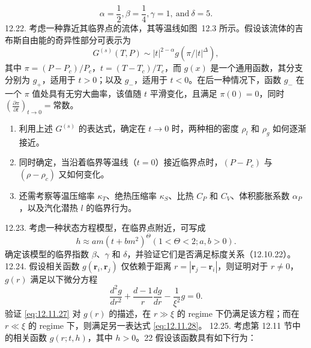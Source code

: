\begin{equation}\tag{12.13.45}\label{eq:12.13.45}
\alpha = \frac { 1 } { 2 } , \beta = \frac { 1 } { 4 } , \gamma = 1 , \mathrm { ~ a n d ~ } \delta = 5 .
\end{equation}
12.22. 考虑一种靠近其临界点的流体，其等温线如图~12.3 所示。假设该流体的吉布斯自由能的奇异性部分可表示为
\begin{equation}\tag{12.13.46}\label{eq:12.13.46}
G ^{( s )} ( T , P ) \sim | t | ^{2 - \alpha} g ( \pi / | t | ^{\Delta} ) ,
\end{equation}
其中 \(\pi = (P - P_{c})/P_{c}\)，\(t = (T - T_{c})/T_{c}\)，而 \(g(x)\) 是一个通用函数，其分支分别为 \(g_{+}\)，适用于 \(t > 0\)；以及 \(g_{-}\)，适用于 \(t < 0\)。在后一种情况下，函数 \(g_{-}\) 在一个 \(\pi\) 值处具有无穷大曲率，该值随 \(t\) 平滑变化，且满足 \(\pi(0) = 0\)，同时 \(\left(\frac{\partial\pi}{\partial t}\right)_{t\to0} = \text{常数}\)。
\begin{enumerate}
\def\labelenumi{(\alph{enumi})}
\item
  利用上述 \(G^{(s)}\) 的表达式，确定在 \(t \rightarrow 0\) 时，两种相的密度 \(\rho_{l}\) 和 \(\rho_{g}\) 如何逐渐接近。
\item
  同时确定，当沿着临界等温线（\(t = 0\)）接近临界点时，\((P - P_{c})\) 与 \((\rho - \rho_{c})\) 又如何变化。
\item
  还需考察等温压缩率 \(\kappa_{T}\)、绝热压缩率 \(\kappa_{S}\)、比热 \(C_{P}\) 和 \(C_{V}\)、体积膨胀系数 \(\alpha_{P}\)，以及汽化潜热 \(l\) 的临界行为。
\end{enumerate}
12.23. 考虑一种状态方程模型，在临界点附近，可写成
\begin{equation}\tag{12.13.47}\label{eq:12.13.47}
h \approx a m ( t + b m ^{2} ) ^{\Theta}  ( 1 < \Theta < 2 ; a , b > 0 ) .
\end{equation}
确定该模型的临界指数 \(\beta\)、\(\gamma\) 和 \(\delta\)，并验证它们是否满足标度关系（12.10.22）。
12.24. 假设相关函数 \(g(\boldsymbol{r}_i, \boldsymbol{r}_j)\) 仅依赖于距离 \(r = |\boldsymbol{r}_j - \boldsymbol{r}_i|\)，则证明对于 \(r \neq 0\)，\(g(r)\) 满足以下微分方程
\begin{equation}\tag{12.13.48}\label{eq:12.13.48}
\frac { d ^{2} g } { d r ^{2} } + \frac { d - 1 } { r } \frac { d g } { d r } - \frac { 1 } { \xi ^{2} } g = 0 .
\end{equation}
验证 \autoref{eq:12.11.27} 对 \(g(r)\) 的描述，在 \(r \gg \xi\) 的 regime 下仍满足该方程；而在 \(r \ll \xi\) 的 regime 下，则满足另一表达式 \autoref{eq:12.11.28}。
12.25. 考虑第 12.11 节中的相关函数 \(g(r; t, h)\)，其中 \(h > 0\)。22 假设该函数具有如下行为：
